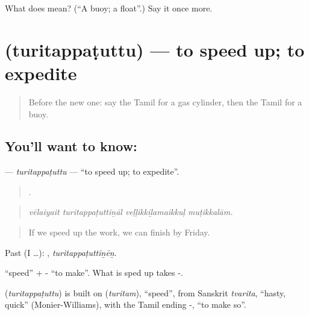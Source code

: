 \begin{tcolorbox}[breakable,colback=teal!4,colframe=teal!35!black,title={Before you move on}]
What does  mean? (\textquotedblleft{}A buoy; a float\textquotedblright{}.) Say it once more.
\end{tcolorbox}
\section[\texorpdfstring{\ta{துரிதப்படுத்து} (turitappaṭuttu)}{துரிதப்படுத்து (turitappaṭuttu)}]{ (turitappaṭuttu) — to speed up; to expedite}

\label{lesson:TA-C552-turitappatuttu}



\begin{quote}
Before the new one: say the Tamil for a gas cylinder, then the Tamil for a buoy.
\end{quote}

\subsection*{You'll want to know: }
\textbf{} — \emph{turitappaṭuttu} — \textquotedblleft{}to speed up; to expedite\textquotedblright{}.

\begin{quote}
   .
\end{quote}

\begin{quote}
\emph{vēlaiyait turitappaṭuttiṉāl veḷḷikkiḻamaikkuḷ muṭikkalām.}
\end{quote}

\begin{quote}
If we speed up the work, we can finish by Friday.
\end{quote}

Past (I …): , \emph{turitappaṭuttiṉēṉ}.

 \textquotedblleft{}speed\textquotedblright{} + - \textquotedblleft{}to make\textquotedblright{}. What is sped up takes -.

\begin{cousinweb}
\textbf{} (\emph{turitappaṭuttu}) is built on  (\emph{turitam}), \textquotedblleft{}speed\textquotedblright{}, from Sanskrit \emph{tvarita}, \textquotedblleft{}hasty, quick\textquotedblright{} (Monier-Williams), with the Tamil ending -, \textquotedblleft{}to make so\textquotedblright{}.
\end{cousinweb}


